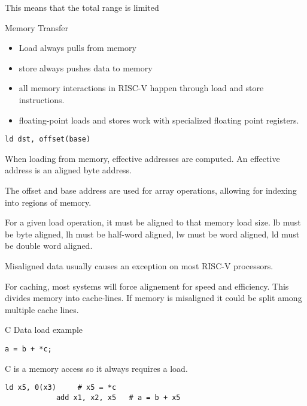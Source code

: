 \documentclass{report}
\begin{document}
\begin{description}
\begin{itemize}
                This means that the total range is limited
        \end{itemize}
    \item {\large Memory Transfer}
        \begin{itemize}
            \item Load always pulls from memory
            \item store always pushes data to memory
            \item all memory interactions in RISC-V happen through
                load and store instructions.

            \item floating-point loads and stores work with specialized
                floating point registers.
        \end{itemize}

        \begin{lstlisting}[language={[x86asm]Assembler}]
            ld dst, offset(base)
        \end{lstlisting}

        When loading from memory, effective addresses are
        computed. An effective address is an aligned byte
        address.

        The offset and base address are used for array operations,
        allowing for indexing into regions of memory.

        For a given load operation, it must be aligned to that
        memory load size. lb must be byte aligned, lh must be
        half-word aligned, lw must be word aligned, ld must
        be double word aligned.

        Misaligned data usually causes an exception on most RISC-V
        processors.

        For caching, most systems will force alignement for speed
        and efficiency. This divides memory into cache-lines. If
        memory is misaligned it could be split among multiple
        cache lines.

    \item {\large C Data load example}
        \begin{lstlisting}[langauge = C]
            a = b + *c;
        \end{lstlisting}

        C is a memory access so it always requires a load.

        \begin{lstlisting}[language = {[x86asm]Assembler}]
            ld x5, 0(x3)     # x5 = *c
            add x1, x2, x5   # a = b + x5
        \end{lstlisting}



\end{description}
\end{document}
